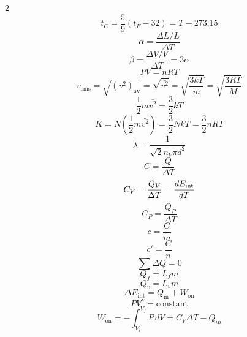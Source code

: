 \begin{multicols*}{2}
\begin{equation*}
    t_C = \frac59 \left( t_F - 32 \right) = T - 273.15
\end{equation*}
\begin{equation*}
    \alpha = \frac{\Delta L / L}{\Delta T}
\end{equation*}
\begin{equation*}
    \beta = \frac{\Delta V / V}{\Delta T} = 3\alpha
\end{equation*}
\begin{equation*}
    PV = nRT
\end{equation*}
\begin{equation*}
    v_\mathrm{rms} = \sqrt{\left(v^2\right)_\mathrm{av}} =
    \sqrt{\bar{v^2}} = \sqrt{\frac{3kT}{m}} = \sqrt{\frac{3RT}{M}}
\end{equation*}
\begin{equation*}
    \frac{1}{2} m \bar{v^2} = \frac{3}{2} k T
\end{equation*}
\begin{equation*}
    K = N \left( \frac{1}{2} m \bar{v^2} \right) = \frac32 N k T = \frac32 nRT
\end{equation*}
\begin{equation*}
    \lambda = \frac{1}{\sqrt{2} n_V \pi d^2}
\end{equation*}
\begin{equation*}
    C = \frac{Q}{\Delta T}
\end{equation*}
\begin{equation*}
    C_V = \frac{Q_V}{\Delta T} = \frac{d E_\mathrm{int}}{d T}
\end{equation*}
\begin{equation*}
    C_P = \frac{Q_P}{\Delta T}
\end{equation*}
\begin{equation*}
    c = \frac{C}{m}
\end{equation*}
\begin{equation*}
    c' = \frac{C}{n}
\end{equation*}
\begin{equation*}
    \sum \Delta Q = 0
\end{equation*}
\begin{equation*}
    Q_f = L_f m
\end{equation*}
\begin{equation*}
    Q_v = L_v m
\end{equation*}
\begin{equation*}
    \Delta E_\mathrm{int} = Q_\mathrm{in} + W_\mathrm{on}
\end{equation*}
\begin{equation*}
    PV^\gamma = \mathrm{constant}
\end{equation*}
\begin{equation*}
    W_\mathrm{on} = -\int_{V_i}^{V_f} P\,dV = C_V\Delta T - Q_{in}
\end{equation*}


\end{multicols*}
